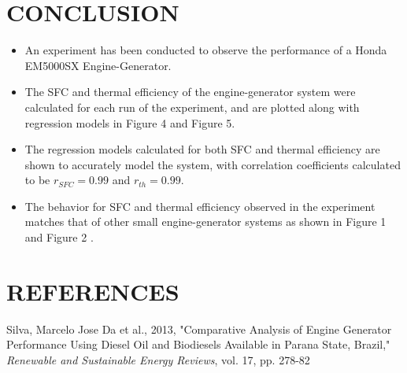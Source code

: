 \documentclass[12pt]{article}
\begin{document}
\section*{\fontsize{12}{12}\selectfont CONCLUSION}

\begin{itemize}

\item An experiment has been conducted to observe the performance of a Honda EM5000SX Engine-Generator.

\item The SFC and thermal efficiency of the engine-generator system were calculated for each run of the experiment, and are plotted along with regression models in Figure 4 and Figure 5.

\item The regression models calculated for both SFC and thermal efficiency are shown to accurately model the system, with correlation coefficients calculated to be $r_{SFC} = 0.99$ and $r_{th} = 0.99$.

\item The behavior for SFC and thermal efficiency observed in the experiment matches that of other small engine-generator systems as shown in Figure 1 and Figure 2 \cite{Silva}.

\end{itemize}



\section*{\fontsize{12}{12}\selectfont REFERENCES}

\begin{thebibliography}{2}

Silva, Marcelo Jose Da et al., 2013, "Comparative Analysis of Engine Generator Performance Using Diesel Oil and Biodiesels Available in Parana State, Brazil," \emph{Renewable and Sustainable Energy Reviews}, vol. 17, pp. 278-82
\end{thebibliography}
\end{document}
